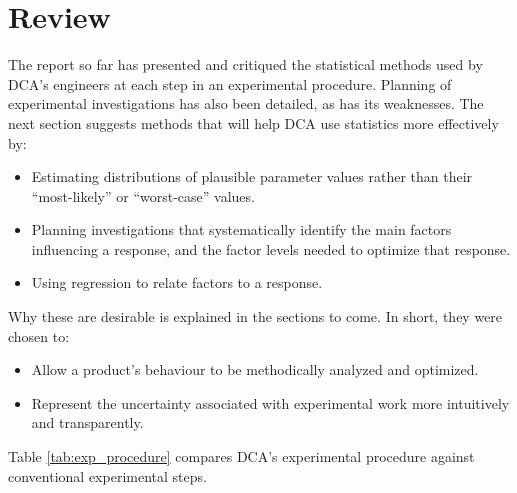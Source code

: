 \documentclass[11pt,a4paper,article]{memoir} %
\begin{document}
\section{Review}
The report so far has presented and critiqued the statistical methods used by DCA's engineers at each step in an experimental procedure. Planning of experimental investigations has also been detailed, as has its weaknesses. The next section suggests methods that will help DCA use statistics more effectively by:
\begin{itemize}
\item Estimating distributions of plausible parameter values rather than their ``most-likely'' or ``worst-case'' values.
\item Planning investigations that systematically identify the main factors influencing a response, and the factor levels needed to optimize that response.
\item Using regression to relate factors to a response.
\end{itemize}
Why these are desirable is explained in the sections to come. In short, they were chosen to:
\begin{itemize}
\item Allow a product's behaviour to be methodically analyzed and optimized.
\item Represent the uncertainty associated with experimental work more intuitively and transparently.
\end{itemize}
Table \ref{tab:exp_procedure} compares DCA's experimental procedure against conventional experimental steps.
\end{document}
